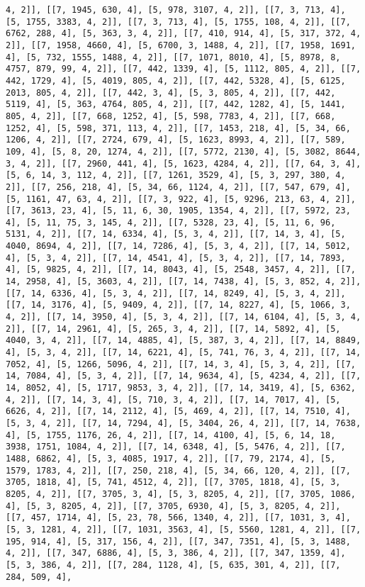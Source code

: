 \documentclass[12pt,fleqn]{article}\usepackage{../../common}
\begin{document}
\begin{verbatim}
4, 2]], [[7, 1945, 630, 4], [5, 978, 3107, 4, 2]], [[7, 3, 713, 4], [5, 1755, 3383, 4, 2]], [[7, 3, 713, 4], [5, 1755, 108, 4, 2]], [[7, 6762, 288, 4], [5, 363, 3, 4, 2]], [[7, 410, 914, 4], [5, 317, 372, 4, 2]], [[7, 1958, 4660, 4], [5, 6700, 3, 1488, 4, 2]], [[7, 1958, 1691, 4], [5, 732, 1555, 1488, 4, 2]], [[7, 1071, 8010, 4], [5, 8978, 8, 4757, 879, 99, 4, 2]], [[7, 442, 1339, 4], [5, 1112, 805, 4, 2]], [[7, 442, 1729, 4], [5, 4019, 805, 4, 2]], [[7, 442, 5328, 4], [5, 6125, 2013, 805, 4, 2]], [[7, 442, 3, 4], [5, 3, 805, 4, 2]], [[7, 442, 5119, 4], [5, 363, 4764, 805, 4, 2]], [[7, 442, 1282, 4], [5, 1441, 805, 4, 2]], [[7, 668, 1252, 4], [5, 598, 7783, 4, 2]], [[7, 668, 1252, 4], [5, 598, 371, 113, 4, 2]], [[7, 1453, 218, 4], [5, 34, 66, 1206, 4, 2]], [[7, 2724, 679, 4], [5, 1623, 8993, 4, 2]], [[7, 589, 109, 4], [5, 8, 20, 1274, 4, 2]], [[7, 5772, 2130, 4], [5, 3082, 8644, 3, 4, 2]], [[7, 2960, 441, 4], [5, 1623, 4284, 4, 2]], [[7, 64, 3, 4], [5, 6, 14, 3, 112, 4, 2]], [[7, 1261, 3529, 4], [5, 3, 297, 380, 4, 2]], [[7, 256, 218, 4], [5, 34, 66, 1124, 4, 2]], [[7, 547, 679, 4], [5, 1161, 47, 63, 4, 2]], [[7, 3, 922, 4], [5, 9296, 213, 63, 4, 2]], [[7, 3613, 23, 4], [5, 11, 6, 30, 1905, 1354, 4, 2]], [[7, 5972, 23, 4], [5, 11, 75, 3, 145, 4, 2]], [[7, 5328, 23, 4], [5, 11, 6, 96, 5131, 4, 2]], [[7, 14, 6334, 4], [5, 3, 4, 2]], [[7, 14, 3, 4], [5, 4040, 8694, 4, 2]], [[7, 14, 7286, 4], [5, 3, 4, 2]], [[7, 14, 5012, 4], [5, 3, 4, 2]], [[7, 14, 4541, 4], [5, 3, 4, 2]], [[7, 14, 7893, 4], [5, 9825, 4, 2]], [[7, 14, 8043, 4], [5, 2548, 3457, 4, 2]], [[7, 14, 2958, 4], [5, 3603, 4, 2]], [[7, 14, 7438, 4], [5, 3, 852, 4, 2]], [[7, 14, 6336, 4], [5, 3, 4, 2]], [[7, 14, 8249, 4], [5, 3, 4, 2]], [[7, 14, 3176, 4], [5, 9409, 4, 2]], [[7, 14, 8227, 4], [5, 1066, 3, 4, 2]], [[7, 14, 3950, 4], [5, 3, 4, 2]], [[7, 14, 6104, 4], [5, 3, 4, 2]], [[7, 14, 2961, 4], [5, 265, 3, 4, 2]], [[7, 14, 5892, 4], [5, 4040, 3, 4, 2]], [[7, 14, 4885, 4], [5, 387, 3, 4, 2]], [[7, 14, 8849, 4], [5, 3, 4, 2]], [[7, 14, 6221, 4], [5, 741, 76, 3, 4, 2]], [[7, 14, 7052, 4], [5, 1266, 5096, 4, 2]], [[7, 14, 3, 4], [5, 3, 4, 2]], [[7, 14, 7084, 4], [5, 3, 4, 2]], [[7, 14, 9634, 4], [5, 4234, 4, 2]], [[7, 14, 8052, 4], [5, 1717, 9853, 3, 4, 2]], [[7, 14, 3419, 4], [5, 6362, 4, 2]], [[7, 14, 3, 4], [5, 710, 3, 4, 2]], [[7, 14, 7017, 4], [5, 6626, 4, 2]], [[7, 14, 2112, 4], [5, 469, 4, 2]], [[7, 14, 7510, 4], [5, 3, 4, 2]], [[7, 14, 7294, 4], [5, 3404, 26, 4, 2]], [[7, 14, 7638, 4], [5, 1755, 1176, 26, 4, 2]], [[7, 14, 4100, 4], [5, 6, 14, 18, 3938, 1751, 1084, 4, 2]], [[7, 14, 6348, 4], [5, 5476, 4, 2]], [[7, 1488, 6862, 4], [5, 3, 4085, 1917, 4, 2]], [[7, 79, 2174, 4], [5, 1579, 1783, 4, 2]], [[7, 250, 218, 4], [5, 34, 66, 120, 4, 2]], [[7, 3705, 1818, 4], [5, 741, 4512, 4, 2]], [[7, 3705, 1818, 4], [5, 3, 8205, 4, 2]], [[7, 3705, 3, 4], [5, 3, 8205, 4, 2]], [[7, 3705, 1086, 4], [5, 3, 8205, 4, 2]], [[7, 3705, 6930, 4], [5, 3, 8205, 4, 2]], [[7, 457, 1714, 4], [5, 23, 78, 566, 1340, 4, 2]], [[7, 1031, 3, 4], [5, 3, 1281, 4, 2]], [[7, 1031, 3563, 4], [5, 5560, 1281, 4, 2]], [[7, 195, 914, 4], [5, 317, 156, 4, 2]], [[7, 347, 7351, 4], [5, 3, 1488, 4, 2]], [[7, 347, 6886, 4], [5, 3, 386, 4, 2]], [[7, 347, 1359, 4], [5, 3, 386, 4, 2]], [[7, 284, 1128, 4], [5, 635, 301, 4, 2]], [[7, 284, 509, 4], 
\end{verbatim}
\end{document}
